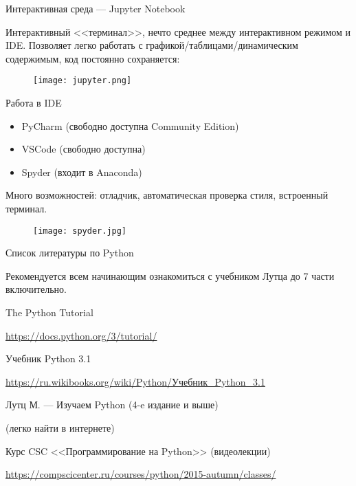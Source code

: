 \documentclass[11pt, fleqn, xcolor=x11names]{beamer}
\begin{document}
\begin{frame}{Интерактивная среда --- Jupyter Notebook}

Интерактивный <<терминал>>, нечто среднее между интерактивном режимом и IDE. Позволяет легко работать с графикой/таблицами/динамическим содержимым, код постоянно сохраняется:

\begin{figure}
\texttt{[image: jupyter.png]}
\end{figure}

\end{frame}

\begin{frame}{Работа в IDE}

\begin{itemize}
\item PyCharm (свободно доступна Community Edition)
\item VSCode (свободно доступна)
\item Spyder (входит в Anaconda)
\end{itemize}

Много возможностей: отладчик, автоматическая проверка стиля, встроенный терминал.

\begin{figure}
\texttt{[image: spyder.jpg]}
\end{figure}

\end{frame}


\begin{frame}{Список литературы по Python}

Рекомендуется всем начинающим ознакомиться с учебником Лутца до 7 части включительно.

\hfill

\begin{thebibliography}{1}
\item The Python Tutorial

\small{\href{https://docs.python.org/3/tutorial/}{https://docs.python.org/3/tutorial/}}

\item Учебник Python 3.1 

\small{\href{https://ru.wikibooks.org/wiki/Python/\%D0\%A3\%D1\%87\%D0\%B5\%D0\%B1\%D0\%BD\%D0\%B8\%D0\%BA_Python_3.1}{https://ru.wikibooks.org/wiki/Python/Учебник\_Python\_3.1}}


\item Лутц М. --- Изучаем Python (4-e издание и выше)

(легко найти в интернете)

\item Курс CSC <<Программирование на Python>> (видеолекции)

\small{\href{https://compscicenter.ru/courses/python/2015-autumn/classes/}{https://compscicenter.ru/courses/python/2015-autumn/classes/}}

\end{thebibliography}

\end{frame}
\end{document}
